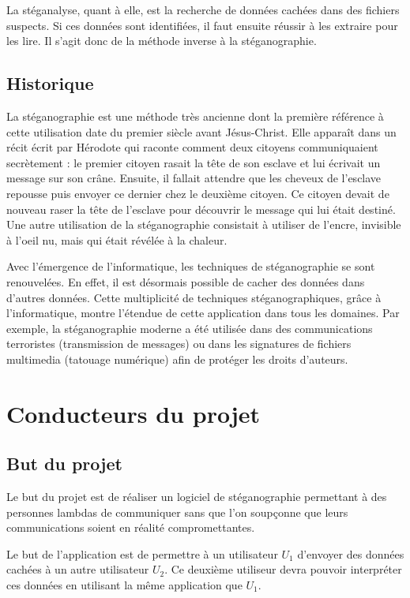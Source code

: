 \documentclass[11pt]{article}
\begin{document}
La stéganalyse, quant à elle, est la recherche de données cachées dans des fichiers suspects. Si ces données sont identifiées, il faut ensuite réussir à les
extraire pour les lire. Il s'agit donc de la méthode inverse à la stéganographie. 

\subsection{Historique}
La stéganographie est une méthode très ancienne dont la première référence à cette utilisation date du premier siècle avant Jésus-Christ. 
Elle apparaît dans un récit écrit par Hérodote qui raconte comment deux citoyens communiquaient secrètement : 
le premier citoyen rasait la tête de son esclave et lui écrivait un message sur son crâne. Ensuite, il fallait attendre que les cheveux de l'esclave repousse puis envoyer ce dernier chez le deuxième citoyen. 
Ce citoyen devait de nouveau raser la tête de l'esclave pour découvrir le message qui lui était destiné. 
Une autre utilisation de la stéganographie consistait à utiliser de l'encre, invisible à l'oeil nu, mais qui était révélée à la chaleur. 

Avec l'émergence de l'informatique, les techniques de stéganographie se sont renouvelées. En effet, il est désormais possible de cacher des données dans d'autres données. 
Cette multiplicité de techniques stéganographiques, grâce à l'informatique, montre l'étendue de cette application dans tous les domaines. 
Par exemple, la stéganographie moderne a été utilisée dans des communications terroristes (transmission de messages) ou dans les signatures de fichiers multimedia (tatouage numérique) afin de protéger les droits d'auteurs. 

\section{Conducteurs du projet}

\subsection{But du projet}
Le but du projet est de réaliser un logiciel de stéganographie permettant à des personnes lambdas de communiquer sans que l'on soupçonne que leurs communications soient en réalité compromettantes. 

Le but de l'application est de permettre à un utilisateur $U_1$ d'envoyer des données cachées à un autre utilisateur $U_2$. Ce deuxième utiliseur devra pouvoir interpréter ces données en utilisant la même application que $U_1$. 
\end{document}
